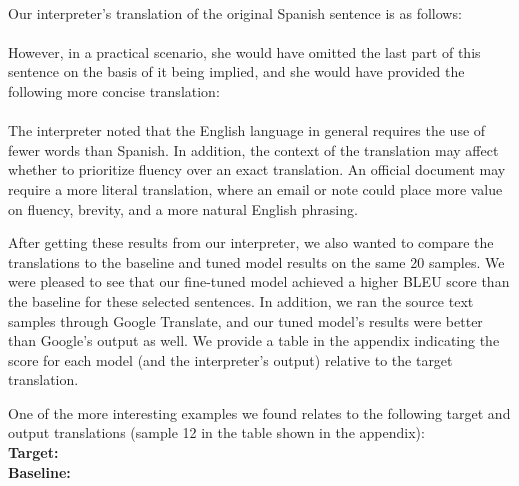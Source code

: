 \documentclass{article}
\begin{document}
\begin{multicols}{2}
\\

Our interpreter’s translation of the original Spanish sentence is as follows:\\

\\

However, in a practical scenario, she would have omitted the last part of this sentence on the basis of it being implied, and she would have provided the following more concise translation:\\

\\

The interpreter noted that the English language in general requires the use of fewer words than Spanish. In addition, the context of the translation may affect whether to prioritize fluency over an exact translation. An official document may require a more literal translation, where an email or note could place more value on fluency, brevity, and a more natural English phrasing.

After getting these results from our interpreter, we also wanted to compare the translations to the baseline and tuned model results on the same 20 samples. We were pleased to see that our fine-tuned model achieved a higher BLEU score than the baseline for these selected sentences. In addition, we ran the source text samples through Google Translate, and our tuned model’s results were better than Google’s output as well. We provide a table in the appendix indicating the score for each model (and the interpreter’s output) relative to the target translation.

One of the more interesting examples we found relates to the following target and output translations (sample 12 in the table shown in the appendix): \\


\textbf{Target: }\\

\textbf{Baseline: }\\


\end{multicols}
\end{document}
